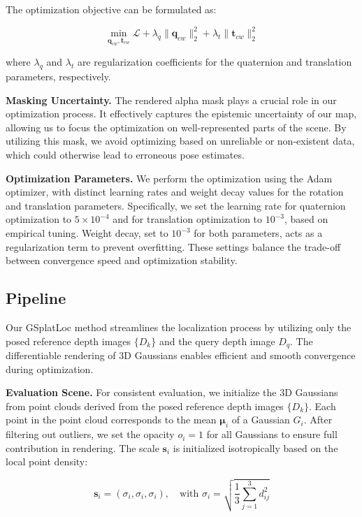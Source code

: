\documentclass[twocolumn]{article} %
\begin{document}
The optimization objective can be formulated as:

\[
\min_{\mathbf{q}_{cw}, \mathbf{t}_{cw}} \mathcal{L} + \lambda_q \|\mathbf{q}_{cw}\|_2^2 + \lambda_t \|\mathbf{t}_{cw}\|_2^2
\]

where \(\lambda_q\) and \(\lambda_t\) are regularization coefficients
for the quaternion and translation parameters, respectively.

\textbf{Masking Uncertainty.} The rendered alpha mask plays a crucial
role in our optimization process. It effectively captures the epistemic
uncertainty of our map, allowing us to focus the optimization on
well-represented parts of the scene. By utilizing this mask, we avoid
optimizing based on unreliable or non-existent data, which could
otherwise lead to erroneous pose estimates.

\textbf{Optimization Parameters.} We perform the optimization using the
Adam optimizer, with distinct learning rates and weight decay values for
the rotation and translation parameters. Specifically, we set the
learning rate for quaternion optimization to \(5 \times 10^{-4}\) and
for translation optimization to \(10^{-3}\), based on empirical tuning.
Weight decay, set to \(10^{-3}\) for both parameters, acts as a
regularization term to prevent overfitting. These settings balance the
trade-off between convergence speed and optimization stability.

\subsection{Pipeline}\label{pipeline}

Our GSplatLoc method streamlines the localization process by utilizing
only the posed reference depth images \(\{D_k\}\) and the query depth
image \(D_q\). The differentiable rendering of 3D Gaussians enables
efficient and smooth convergence during optimization.

\textbf{Evaluation Scene.} For consistent evaluation, we initialize the
3D Gaussians from point clouds derived from the posed reference depth
images \(\{D_k\}\). Each point in the point cloud corresponds to the
mean \(\boldsymbol{\mu}_i\) of a Gaussian \(G_i\). After filtering out
outliers, we set the opacity \(o_i = 1\) for all Gaussians to ensure
full contribution in rendering. The scale \(\mathbf{s}_i\) is
initialized isotropically based on the local point density:

\[
\mathbf{s}_i = (\sigma_i, \sigma_i, \sigma_i), \quad \text{with } \sigma_i = \sqrt{\frac{1}{3}\sum_{j=1}^3 d_{ij}^2}
\]
\end{document}
